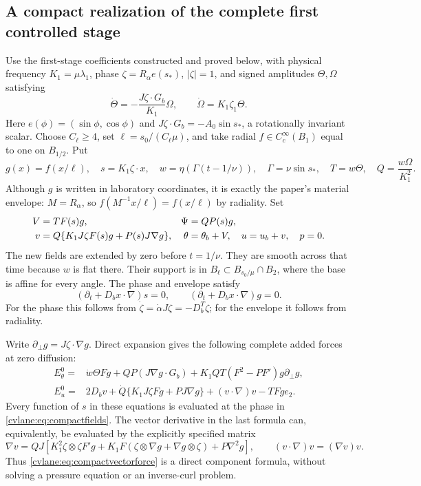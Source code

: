 \subsection{A compact realization of the complete first controlled stage}
Use the first-stage coefficients constructed and proved below, with
physical frequency $K_1=\mu\lambda_1$, phase $\zeta=R_\alpha e(s_*)$,
$|\zeta|=1$, and signed amplitudes $\Theta,\Omega$ satisfying
\begin{equation}
 \dot\Theta=-\frac{J\zeta\cdot G_b}{K_1}\Omega,
 \qquad \dot\Omega=K_1\zeta_1\Theta.
 \label{cvlane:eq:firstphysicalpair}
\end{equation}
Here $e(\phi)=(\sin\phi,\cos\phi)$ and
$J\zeta\cdot G_b=-A_0\sin s_*$, a rotationally invariant scalar.
Choose $C_\ell\geq4$, set $\ell=s_0/(C_\ell\mu)$, and take
radial $f\in C_c^\infty(B_1)$ equal to one on $B_{1/2}$.
Put
\[
 g(x)=f(x/\ell),\quad s=K_1\zeta\cdot x,\quad
 w=\eta(\Gamma(t-1/\nu)),\quad \Gamma=\nu\sin s_*,
 \quad T=w\Theta,\quad Q=\frac{w\Omega}{K_1^2}.
\]
Although $g$ is written in laboratory coordinates, it is exactly
the paper's material envelope: $M=R_\alpha$, so
$f(M^{-1}x/\ell)=f(x/\ell)$ by radiality. Set
\begin{align}
 V&=TF(s)g,& \Psi&=QP(s)g,\notag\\
 v&=Q\{K_1J\zeta F(s)g+P(s)J\nabla g\},&
 \theta&=\theta_b+V,\quad u=u_b+v,\quad p=0.
 \label{cvlane:eq:compactfields}
\end{align}
The new fields are extended by zero before $t=1/\nu$. They are
smooth across that time because $w$ is flat there. Their support
is in $B_\ell\subset B_{s_0/\mu}\cap B_2$, where the base is
affine for every angle. The phase and envelope satisfy
\[
 (\partial_t+D_bx\cdot\nabla)s=0,
 \qquad (\partial_t+D_bx\cdot\nabla)g=0.
\]
For the phase this follows from
$\dot\zeta=\dot\alpha J\zeta=-D_b^T\zeta$; for the
envelope it follows from radiality.

Write $\partial_\perp g=J\zeta\cdot\nabla g$. Direct expansion
gives the following complete added forces at zero diffusion:
\begin{align}
 E^0_\theta={}&\dot w\Theta Fg+
 QP(J\nabla g\cdot G_b)
 +K_1QT(F^2-PF')g\partial_\perp g,
 \label{cvlane:eq:compactscalarforce}\\
 E^0_u={}&2D_bv+
 \dot Q\{K_1J\zeta Fg+PJ\nabla g\}
 +(v\cdot\nabla)v-TFg e_2.
 \label{cvlane:eq:compactvectorforce}
\end{align}
Every function of $s$ in these equations is evaluated at the phase
in \eqref{cvlane:eq:compactfields}. The vector derivative in the last formula
can, equivalently, be evaluated by the explicitly specified matrix
\[
 \nabla v=QJ\left[
 K_1^2\zeta\otimes\zeta F'g
 +K_1F(\zeta\otimes\nabla g+\nabla g\otimes\zeta)
 +P\nabla^2g\right],\qquad
 (v\cdot\nabla)v=(\nabla v)v.
\]
Thus \eqref{cvlane:eq:compactvectorforce} is a direct component formula,
without solving a pressure equation or an inverse-curl problem.

